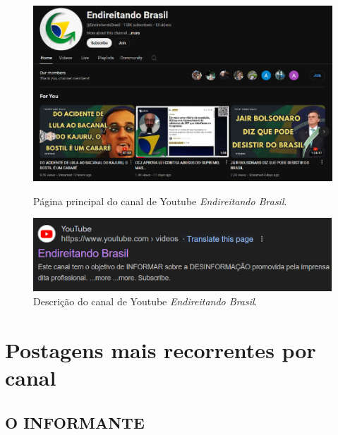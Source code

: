 \documentclass[portuguese]{textolivre}
\begin{document}
\begin{figure}[h!]
\centering
\begin{minipage}[t]{0.45\textwidth}
\centering
\includegraphics[width=\linewidth]{Imagens/Fig11.png}
\caption{Página principal do canal de Youtube \emph{Endireitando Brasil}.}
\label{fig-11}
\end{minipage}
\hfill
\centering
\begin{minipage}[t]{0.45\textwidth}
\centering        
\includegraphics[width=\linewidth]{Imagens/Fig12.png}
\caption{Descrição do canal de Youtube \emph{Endireitando Brasil}.}
\label{fig-12}
\end{minipage}
\end{figure}
    

\section{Postagens mais recorrentes por canal}\label{sec-postagens_recorrentes}

\subsection{O INFORMANTE}
\end{document}
